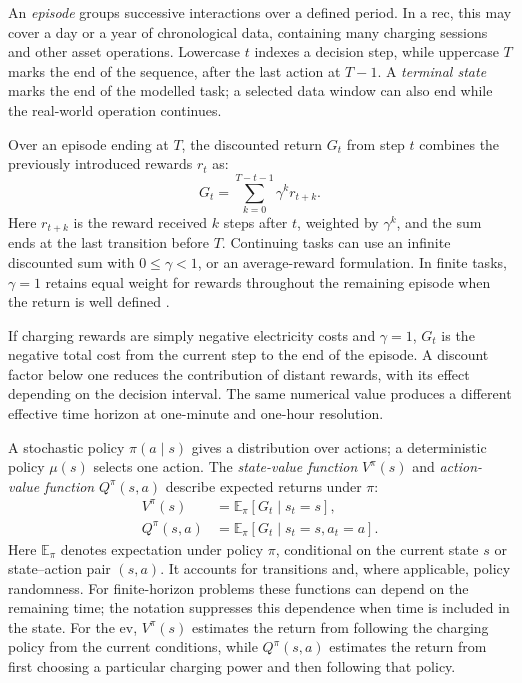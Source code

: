 An \emph{episode} groups successive interactions over a defined period. In a \gls{rec}, this may cover a day or a year of chronological data, containing many charging sessions and other asset operations. Lowercase $t$ indexes a decision step, while uppercase $T$ marks the end of the sequence, after the last action at $T-1$. A \emph{terminal state} marks the end of the modelled task; a selected data window can also end while the real-world operation continues.

Over an episode ending at $T$, the discounted return $G_t$ from step $t$ combines the previously introduced rewards $r_t$ as:
\begin{equation}
G_t=\sum_{k=0}^{T-t-1}\gamma^k r_{t+k}.
\label{eq:ch2-return}
\end{equation}
Here $r_{t+k}$ is the reward received $k$ steps after $t$, weighted by $\gamma^k$, and the sum ends at the last transition before $T$. Continuing tasks can use an infinite discounted sum with $0\leq\gamma<1$, or an average-reward formulation. In finite tasks, $\gamma=1$ retains equal weight for rewards throughout the remaining episode when the return is well defined \parencite{sutton2018rl}.

If charging rewards are simply negative electricity costs and $\gamma=1$, $G_t$ is the negative total cost from the current step to the end of the episode. A discount factor below one reduces the contribution of distant rewards, with its effect depending on the decision interval. The same numerical value produces a different effective time horizon at one-minute and one-hour resolution.

A stochastic policy $\pi(a\mid s)$ gives a distribution over actions; a deterministic policy $\mu(s)$ selects one action. The \emph{state-value function} $V^\pi(s)$ and \emph{action-value function} $Q^\pi(s,a)$ describe expected returns under $\pi$:
\begin{align}
V^\pi(s)&=\mathbb E_\pi[G_t\mid s_t=s],\\
Q^\pi(s,a)&=\mathbb E_\pi[G_t\mid s_t=s,a_t=a].
\label{eq:ch2-value-functions}
\end{align}
Here $\mathbb E_\pi$ denotes expectation under policy $\pi$, conditional on the current state $s$ or state--action pair $(s,a)$. It accounts for transitions and, where applicable, policy randomness. For finite-horizon problems these functions can depend on the remaining time; the notation suppresses this dependence when time is included in the state. For the \gls{ev}, $V^\pi(s)$ estimates the return from following the charging policy from the current conditions, while $Q^\pi(s,a)$ estimates the return from first choosing a particular charging power and then following that policy.

